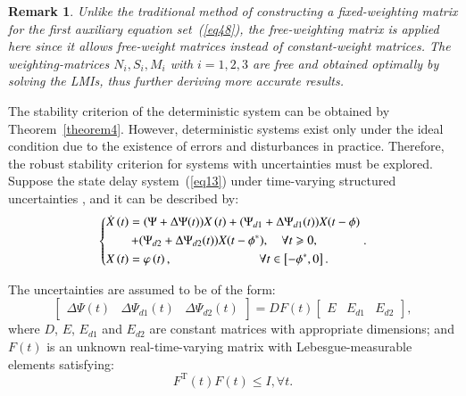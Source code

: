 \documentclass[journal]{IEEEtran}
\newtheorem{remark}[theorem]{Remark}
\begin{document}
\begin{remark}
  Unlike the traditional method of constructing a fixed-weighting matrix for the first auxiliary equation set~(\ref{eq48}), the free-weighting matrix is applied here since it allows free-weight matrices instead of constant-weight matrices. The weighting-matrices $N_i,S_i,M_i$ with $i=1,2,3$ are free and obtained optimally by solving the LMIs, thus further deriving more accurate results.
\end{remark}

The stability criterion of the deterministic system can be obtained by Theorem~\ref{theorem4}. However, deterministic systems exist only under the ideal condition due to the existence of errors and disturbances in practice. Therefore, the robust stability criterion for systems with uncertainties must be explored. Suppose the state delay system~(\ref{eq13}) under time-varying structured uncertainties \citep{Shamma1994,Wu2021,Wu2004}, and it can be described by:
\begin{equation}
  \left\{ \begin{gathered}
    \dot X\left( t \right) = (\Psi  + \Delta \Psi (t))X\left( t \right) + ({\Psi _{d1}} + \Delta {\Psi _{d1}}(t))X(t - \phi ) \hfill \\
    \quad\quad + ({\Psi _{d2}} + \Delta {\Psi _{d2}}(t))X(t - {\phi ^*}),\quad \forall t \geqslant 0, \hfill \\
    X\left( t \right) = \varphi \left( t \right),\quad \quad \quad \quad \quad \quad \quad \forall t \in \left[ { - {\phi ^*},0} \right]. \hfill \\
  \end{gathered}  \right..
  \label{eq411}
\end{equation}

The uncertainties are assumed to be of the form:
\begin{equation}
  \left[ {\begin{array}{*{20}{c}}
          {\Delta \Psi (t)} & {\Delta {\Psi _{d1}}(t)} & {\Delta {\Psi _{d2}}(t)}
        \end{array}} \right] = DF(t)\left[ {\begin{array}{*{20}{c}}
          E & {{E_{d1}}} & {{E_{d2}}}
        \end{array}} \right],
  \label{eq4XX}
\end{equation}
where $D$, $E$, $E_{d1}$ and $E_{d2}$ are constant matrices with appropriate dimensions; and $F(t)$ is an unknown real-time-varying matrix with Lebesgue-measurable elements satisfying:
\begin{equation}
  {F^{\text{T}}}(t)F(t) \le I,  \forall t.
  \label{eq4XX2}
\end{equation}
\end{document}
